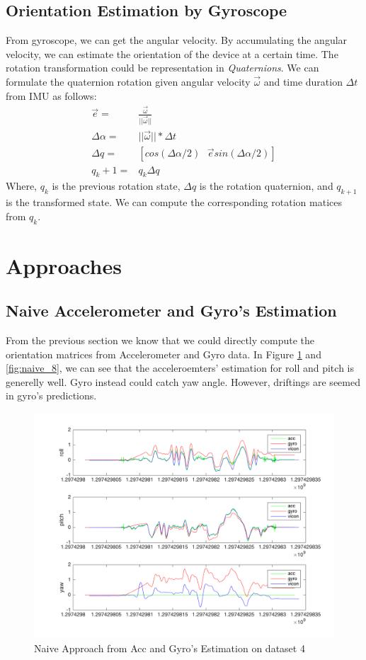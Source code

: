 \documentclass[english]{article}
\begin{document}
\subsection {Orientation Estimation by Gyroscope}
From gyroscope, we can get the angular velocity. By accumulating the angular velocity, we can estimate the orientation of the device at a certain time. The rotation transformation could be representation in \emph{Quaternions}. We can formulate the quaternion rotation given angular velocity $\vec\omega$ and time duration $\Delta t$ from IMU as follows:
\begin{align}
\vec{e} = &\frac{\vec\omega}{||\vec\omega||}\\
\Delta \alpha =& ||\vec\omega||*\Delta t\\
\Delta  q =& [cos(\Delta\alpha/2) \text{  } \vec e sin(\Delta\alpha/2)]\\
q_k+1 = & q_k \Delta q 
\end{align}
Where, $q_k$ is the previous rotation state, $\Delta q$ is the rotation quaternion, and $q_{k+1}$ is the transformed state. We can compute the corresponding rotation matices from $q_k$.

\section {Approaches}
\subsection {Naive Accelerometer and Gyro's Estimation}
From the previous section we know that we could directly compute the orientation matrices from Accelerometer and Gyro data. 
In Figure \ref{fig:naive_4} and \ref{fig:naive_8}, we can see that the acceleroemters' estimation for roll and pitch is generelly well. Gyro instead could catch yaw angle. However, driftings are seemed in gyro's predictions. 


\begin{figure}
\centering
\includegraphics[scale=0.5]{images/naive_approach_4.png} 
\caption{Naive Approach from Acc and Gyro's Estimation on dataset 4}
\label{fig:naive_4}
\end{figure}
\end{document}
